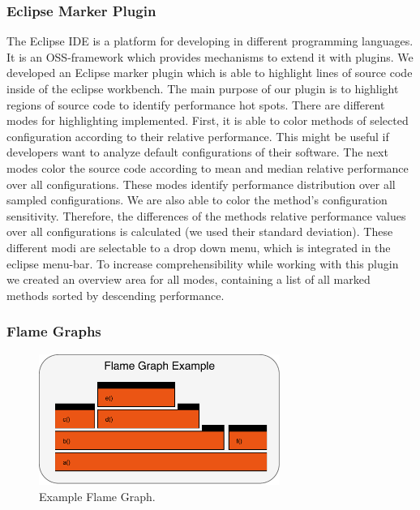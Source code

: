 
\subsubsection{Eclipse Marker Plugin}

The Eclipse IDE is a platform for developing in different programming languages. It is an \ac{OSS}-framework which provides mechanisms to extend it with plugins. We developed an Eclipse marker plugin which is able to highlight lines of source code inside of the eclipse workbench. The main purpose of our plugin is to highlight regions of source code to identify performance hot spots. There are different modes for highlighting implemented. First, it is able to color methods of selected configuration according to their relative performance. This might be useful if developers want to analyze default configurations of their software. The next modes color the source code according to mean and median relative performance over all configurations. These modes identify performance distribution over all sampled configurations. We are also able to color the method's configuration sensitivity. Therefore, the differences of the methods relative performance values over all configurations is calculated (we used their standard deviation). These different modi are selectable to a drop down menu, which is integrated in the eclipse menu-bar. To increase comprehensibility while working with this plugin we created an overview area for all modes, containing a list of all marked methods sorted by descending performance. 


\subsubsection{Flame Graphs}

\begin{figure}[h]
  \centering
  \includegraphics[width=0.7\textwidth]{images/Exampleflamegraph}
  \caption{Example Flame Graph.}
  \label{ex_flame_graph}
\end{figure}

